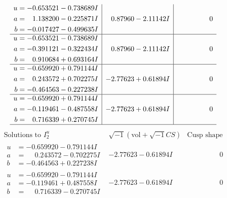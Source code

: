 \documentclass[1p]{elsarticle_modified}
\theoremstyle{definition}
\newcommand{\I}{\sqrt{-1}}
\begin{document}
$$\begin{array}{c|c|c}
\begin{aligned}
u &= -0.653521 - 0.738689 I \\
a &= \phantom{-}1.138200 - 0.225871 I \\
b &= -0.017427 - 0.499635 I\end{aligned}
 & \phantom{-}0.87960 - 2.11142 I & \phantom{-0.000000 } 0 \\ \hline\begin{aligned}
u &= -0.653521 - 0.738689 I \\
a &= -0.391121 - 0.322434 I \\
b &= \phantom{-}0.910684 + 0.693164 I\end{aligned}
 & \phantom{-}0.87960 - 2.11142 I & \phantom{-0.000000 } 0 \\ \hline\begin{aligned}
u &= -0.659920 + 0.791144 I \\
a &= \phantom{-}0.243572 + 0.702275 I \\
b &= -0.464563 - 0.227238 I\end{aligned}
 & -2.77623 + 0.61894 I & \phantom{-0.000000 } 0 \\ \hline\begin{aligned}
u &= -0.659920 + 0.791144 I \\
a &= -0.119461 - 0.487558 I \\
b &= \phantom{-}0.716339 + 0.270745 I\end{aligned}
 & -2.77623 + 0.61894 I & \phantom{-0.000000 } 0\\
 \hline 
 \end{array}$$\newpage$$\begin{array}{c|c|c}  
\text{Solutions to }I^u_{2}& \I (\text{vol} + \sqrt{-1}CS) & \text{Cusp shape}\\
 \hline 
\begin{aligned}
u &= -0.659920 - 0.791144 I \\
a &= \phantom{-}0.243572 - 0.702275 I \\
b &= -0.464563 + 0.227238 I\end{aligned}
 & -2.77623 - 0.61894 I & \phantom{-0.000000 } 0 \\ \hline\begin{aligned}
u &= -0.659920 - 0.791144 I \\
a &= -0.119461 + 0.487558 I \\
b &= \phantom{-}0.716339 - 0.270745 I\end{aligned}
 & -2.77623 - 0.61894 I & \phantom{-0.000000 } 0 \\ \hline\begin{aligned}

\end{aligned}
\end{array}$$
\end{document}

